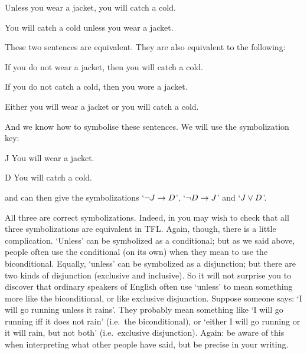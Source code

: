 \begin{earg}
\item[\ex{unless1}] Unless you wear a jacket, you will catch a cold.
\item[\ex{unless2}] You will catch a cold unless you wear a jacket.
\end{earg}
These two sentences are equivalent. They are also equivalent to the following:
\begin{earg}
\item[\ex{unless3}]  If you do not wear a jacket, then you will catch a cold.
\item[\ex{unless4}]  If you do not catch a cold, then you wore a jacket.
\item [\ex{unless5}] Either you will wear a jacket or you will catch a cold.
\end{earg}
And we know how to symbolise these sentences. We will use the symbolization key:
	\begin{ekey}
		\item[J] You will wear a jacket.
		\item[D] You will catch a cold.
	\end{ekey} and can then give the symbolizations `$\neg J \rightarrow D$', `$\neg D \rightarrow J$' and `$J \vee D$'.

All three are correct symbolizations. Indeed, in you may wish to check that all three symbolizations are equivalent in TFL.
Again, though, there is a little complication. `Unless' can be symbolized as a conditional; but as we said above, people often use the conditional (on its own) when they mean to use the biconditional. Equally, `unless' can be symbolized as a disjunction; but there are two kinds of disjunction (exclusive and inclusive). So it will not surprise you to discover that ordinary speakers of English often use `unless' to mean something more like the biconditional, or like exclusive disjunction. Suppose someone says: `I will go running unless it rains'. They probably mean something like `I will go running iff it does not rain' (i.e.\ the biconditional), or  `either I will go running or it will rain, but not both' (i.e.\ exclusive disjunction). Again: be aware of this when interpreting what other people have said, but be precise in your writing.


